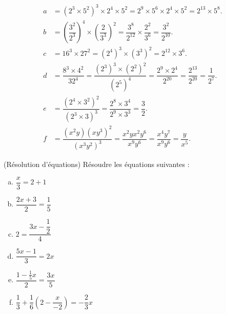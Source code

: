 \documentclass[12pt,
addpoints,
answers,
fleqn
]{exam}
\begin{document}
\begin{questions}
    \begin{solution}
        \begin{align*}
            a & =\left(2^3\times 5^2\right)^3 \times 2^4 \times 5^2 = 2^9\times 5^6 \times 2^4 \times 5^2 = \boxed{2^{13}\times 5^8}.                              \\
            b & =\left(\dfrac{3^2}{2^3}\right)^4\times\left(\dfrac{2}{3^3}\right)^2 = \dfrac{3^8}{2^12}\times\dfrac{2^2}{3^6}=\boxed{\dfrac{3^2}{2^{10}}}.         \\
            c & =16^3\times 27^2 = \left(2^4\right)^3\times\left(3^3\right)^2 = \boxed{2^{12}\times 3^6}.                                                          \\
            d & =\dfrac{8^3\times 4^2}{32^4} = \dfrac{(2^3)^3\times(2^2)^2}{(2^5)^4}= \dfrac{2^9\times 2^4}{2^{20}}=\dfrac{2^{13}}{2^{20}}=\boxed{\dfrac{1}{2^7}}. \\
            e & =\dfrac{\left(2^4\times 3^2\right)^2}{\left(2^3\times 3\right)^3} = \dfrac{2^8\times 3^4}{2^9\times 3^3}=\boxed{\dfrac{3}{2}}.                     \\
            f & =\dfrac{(x^2y)(xy^3)^2}{(x^3y^2)^3}=\dfrac{x^2yx^2y^6}{x^9y^6}=\dfrac{x^4 y^7}{x^9y^6} =\boxed{\dfrac{y}{x^5}}.
        \end{align*}

    \end{solution}

    \question (Résolution d'équations) Résoudre les équations suivantes :
    \begin{multicols}{3}
        \begin{enumerate}[(a)]
            \item $\dfrac{x}{3}=2+1$
            \item $\dfrac{2x+3}{2}=\dfrac{1}{5}$
            \item $2=\dfrac{3x-\dfrac{1}{2}}{4}$
            \item $\dfrac{5x-1}{3}=2x$
            \item $\dfrac{1-\frac{1}{5}x}{2}=\dfrac{3x}{5}$
            \item $\dfrac{1}{3}+\dfrac{1}{6}\left(2-\dfrac{x}{-2}\right)= -\dfrac{2}{3}x$
        \end{enumerate}
    \end{multicols}

    \begin{solution}
\end{solution}
\end{questions}
\end{document}
